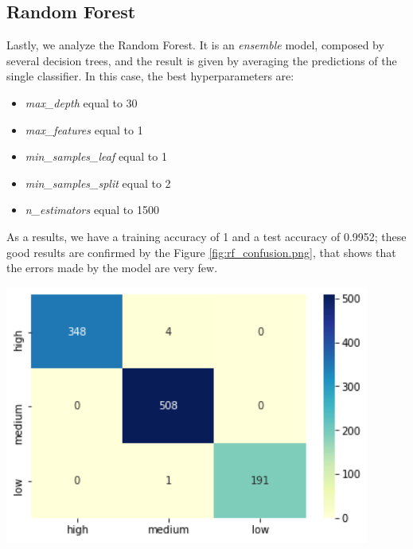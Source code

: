\subsection{Random Forest}
\begin{minipage}{0.59\textwidth}
Lastly, we analyze the Random Forest. It is an \emph{ensemble} model, composed by several decision trees, and the result is given by averaging the predictions of the single classifier.
In this case, the best hyperparameters are:
\begin{itemize}
\item \emph{max\_depth} equal to 30
\item \emph{max\_features} equal to 1
\item \emph{min\_samples\_leaf} equal to 1
\item \emph{min\_samples\_split} equal to 2
\item \emph{n\_estimators} equal to 1500
\end{itemize}
As a results, we have a training accuracy of 1 and a test accuracy of 0.9952; these good results are confirmed by the Figure \ref{fig:rf_confusion.png}, that shows that the errors made by the model are very few.
\end{minipage}
\begin{minipage}{0.4\textwidth}
\centering
\includegraphics[width=0.90\textwidth]{img/rf_confusion.png}
\captionsetup{justification=centering}
\label{fig:rf_confusion}
\end{minipage}
